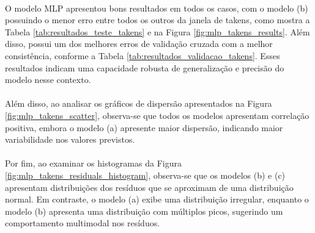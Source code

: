 \paragraph{} O modelo \ac{MLP} apresentou bons resultados em todos os casos, com o modelo (b) possuindo o menor erro entre todos os outros da janela de takens, como mostra a Tabela \ref{tab:resultados_teste_takens} e na Figura \ref{fig:mlp_takens_results}. Além disso, possui um dos melhores erros de validação cruzada com a melhor consistência, conforme a Tabela \ref{tab:resultados_validacao_takens}. Esses resultados indicam uma capacidade robusta de generalização e precisão do modelo nesse contexto.
\paragraph{} Além disso, ao analisar os gráficos de dispersão apresentados na Figura \ref{fig:mlp_takens_scatter}, observa-se que todos os modelos apresentam correlação positiva, embora o modelo (a) apresente maior dispersão, indicando maior variabilidade nos valores previstos.
\paragraph{} Por fim, ao examinar os histogramas da Figura \ref{fig:mlp_takens_residuals_histogram}, observa-se que os modelos (b) e (c) apresentam distribuições dos resíduos que se aproximam de uma distribuição normal. Em contraste, o modelo (a) exibe uma distribuição irregular, enquanto o modelo (b) apresenta uma distribuição com múltiplos picos, sugerindo um comportamento multimodal nos resíduos.

